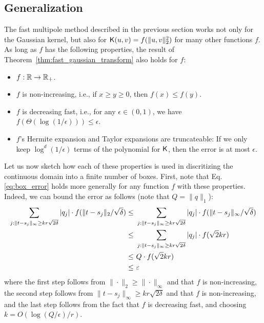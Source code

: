 \subsection{Generalization}\label{sec:fastmm_general}

The fast multipole method described in the previous section works not only for the Gaussian kernel, but also for $\k(u,v) = f(\|u,v\|_2^2)$ for many other functions $f$. As long as $f$ has the following properties, the result of Theorem~\ref{thm:fast_gaussian_transform} also holds for $f$:
\begin{itemize}
    \item $f : \R \rightarrow \R_{+}$.
    \item $f$ is non-increasing, i.e., if $x \geq y \geq 0$, then $f(x) \leq f(y)$.
    \item $f$ is decreasing fast, i.e., for any $\epsilon \in (0,1)$, we have $f( \Theta(\log (1/\epsilon) ) ) \leq \epsilon$.
    \item $f$'s Hermite expansion and Taylor expansions are truncateable: If we only keep $\log^d(1/\epsilon)$ terms of the polynomial for $\k$, then the error is at most $\epsilon$.
\end{itemize}

Let us now sketch how each of these properties is used in discritizing the continuous domain into a finite number of boxes. First, note that Eq.\eqref{eq:box_error} holds more generally for any function $f$ with these properties. Indeed, we can bound the error as follows (note that $Q = \| q \|_1$):
\begin{align}\label{eq:box_error_general}
\sum_{j : \| t - s_j \|_{\infty} \geq k r \sqrt{2\delta} } |q_j| \cdot f( \| t - s_j \|_2 / \sqrt{\delta} ) 
\leq & ~ \sum_{j : \| t - s_j \|_{\infty} \geq k r \sqrt{2\delta} } |q_j| \cdot f( \| t - s_j \|_{\infty}/ \sqrt{\delta} ) \notag\\
\leq & ~  \sum_{j : \| t - s_j \|_{\infty} \geq k r \sqrt{2\delta}} |q_j| \cdot f( \sqrt{2} k r ) \notag \\
\leq & ~ Q \cdot f( \sqrt{2} k r ) \notag \\
\leq & ~ \epsilon
\end{align}
where the first step follows from $\| \cdot \|_2 \geq \| \cdot \|_{\infty}$ and that $f$ is non-increasing, the second step follows from $\| t - s_j\|_{\infty} \geq k r \sqrt{2\delta}$ and that  $f$ is non-increasing, and the last step follows from the fact that $f$ is decreasing fast, and choosing $k = O(\log (Q/\epsilon) / r)$.

